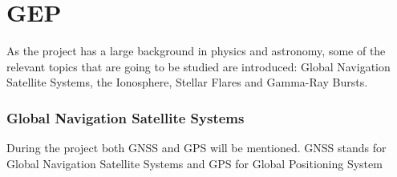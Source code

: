 \chapter{GEP}

As the project has a large background in physics and astronomy, some of the relevant topics that are going to be studied are introduced: Global Navigation Satellite Systems, the Ionosphere, Stellar Flares and Gamma-Ray Bursts.

\subsection{Global Navigation Satellite Systems}

During the project both GNSS and GPS will be mentioned. GNSS stands for Global Navigation Satellite Systems and GPS for Global Positioning System 






